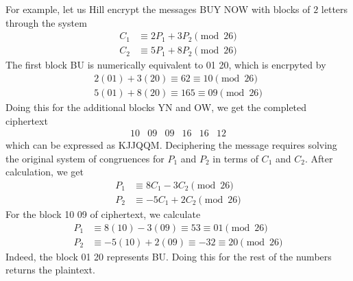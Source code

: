 \documentclass{article}
\newcounter{example}[section]
\begin{document}
For example, let us Hill encrypt the messages BUY NOW with blocks of $2$ letters through the system
\begin{align*}
    C_1 & \equiv 2 P_1 + 3 P_2 \pmod{26} \\
    C_2 & \equiv 5 P_1 + 8 P_2 \pmod{26} 
\end{align*}
The first block BU is numerically equivalent to 01 20, which is encrpyted by 
\begin{align*}
    2 (01) + 3(20) \equiv 62 \equiv 10 \pmod{26} \\
    5(01) + 8(20) \equiv 165 \equiv 09 \pmod{26}
\end{align*}
Doing this for the additional blocks YN and OW, we get the completed ciphertext
\begin{equation}
  \begin{array}{cccccc}
      10&09&09&16&16&12
  \end{array}
\end{equation}
which can be expressed as KJJQQM. Deciphering the message requires solving the original system of congruences for $P_1$ and $P_2$ in terms of $C_1$ and $C_2$. After calculation, we get
\begin{align*}
    P_1 & \equiv 8 C_1 - 3 C_2 \pmod{26} \\
    P_2 & \equiv -5 C_1 + 2 C_2 \pmod{26} 
\end{align*}
For the block 10 09 of ciphertext, we calculate
\begin{align*}
    P_1 & \equiv 8 (10) - 3(09) \equiv 53 \equiv 01 \pmod{26} \\
    P_2 & \equiv -5 (10) + 2 (09) \equiv -32 \equiv 20 \pmod{26}
\end{align*}
Indeed, the block 01 20 represents BU. Doing this for the rest of the numbers returns the plaintext. 
\end{document}
